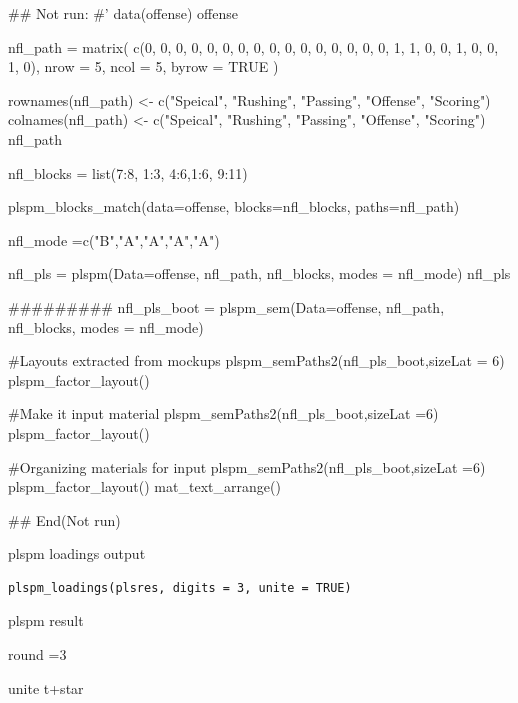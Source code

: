 \documentclass[a4paper]{book}
\begin{document}
\begin{Examples}
\begin{ExampleCode}


\#\# Not run: 
#'
data(offense)
offense %

nfl_path = matrix(
  c(0, 0, 0, 0, 0,
    0, 0, 0, 0, 0,
    0, 0, 0, 0, 0,
    0, 1, 1, 0, 0,
    1, 0, 0, 1, 0),
  nrow = 5, ncol = 5, byrow = TRUE )

rownames(nfl_path) <- c("Speical", "Rushing", "Passing", "Offense", "Scoring")
colnames(nfl_path) <- c("Speical", "Rushing", "Passing", "Offense", "Scoring")
nfl_path

nfl_blocks = list(7:8, 1:3, 4:6,1:6, 9:11)

plspm_blocks_match(data=offense, blocks=nfl_blocks,
                   paths=nfl_path)

nfl_mode =c("B","A","A","A","A")

nfl_pls = plspm(Data=offense, nfl_path, nfl_blocks, modes = nfl_mode)
nfl_pls%

#########
nfl_pls_boot = plspm_sem(Data=offense, nfl_path, nfl_blocks, modes = nfl_mode)

#Layouts extracted from mockups
plspm_semPaths2(nfl_pls_boot,sizeLat = 6)%
  plspm_factor_layout()

#Make it input material
plspm_semPaths2(nfl_pls_boot,sizeLat =6)%
  plspm_factor_layout() %

#Organizing materials for input
plspm_semPaths2(nfl_pls_boot,sizeLat =6)%
  plspm_factor_layout() %
  mat_text_arrange()

## End(Not run)

\end{ExampleCode}
\end{Examples}
%
\begin{Description}
plspm loadings output
\end{Description}
%
\begin{Usage}
\begin{verbatim}
plspm_loadings(plsres, digits = 3, unite = TRUE)
\end{verbatim}
\end{Usage}
%
\begin{Arguments}
\begin{ldescription}
\item[\code{plsres}] plspm result

\item[\code{digits}] round =3

\item[\code{unite}] unite t+star
\end{ldescription}
\end{Arguments}
\end{document}

